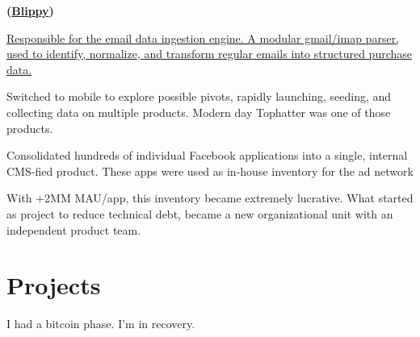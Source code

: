 \documentclass[]{plushcv}
\begin{document}
\begin{minipage}[t]{0.70\textwidth}
 \textbf{(\href{https://techcrunch.com/tag/blippy/}{Blippy})}
\begin{tightemize}
\item \href{https://techcrunch.com/2010/04/01/blippy-amazon/}{Responsible for the email data ingestion engine. A modular gmail/imap parser, used to identify, normalize, and transform regular emails into structured purchase data.}
\item Switched to mobile to explore possible pivots, rapidly launching, seeding, and collecting data on multiple products. Modern day Tophatter was one of those products.
\end{tightemize}
\sectionsep

\begin{tightemize}
\item Consolidated hundreds of individual Facebook applications into a single, internal CMS-fied  product. These apps were used as in-house inventory for the ad network  
\item With +2MM MAU/app, this inventory became extremely lucrative.  What started as project to reduce technical debt, became a new organizational unit with an independent product team.
\end{tightemize}
\sectionsep





\section{Projects}

\begin{tightemize}
\item I had a bitcoin phase. I'm in recovery. 
\end{tightemize}
\sectionsep

\sectionsep
\sectionsep
\sectionsep
\sectionsep



\end{minipage}
\end{document}
